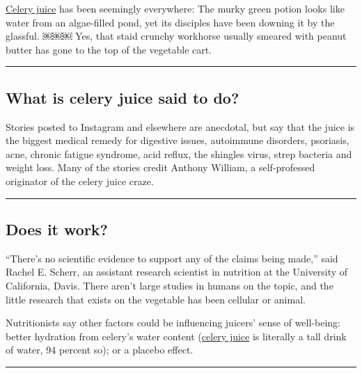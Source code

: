 \href{https://fdc.nal.usda.gov/fdc-app.html\#/food-details/342643/nutrients}{Celery
juice} has been seemingly everywhere: The murky green potion looks like
water from an algae-filled pond, yet its disciples have been downing it
by the glassful. ￼￼￼ Yes, that staid crunchy workhorse usually smeared
with peanut butter has gone to the top of the vegetable cart.

\begin{center}\rule{0.5\linewidth}{\linethickness}\end{center}

\hypertarget{what-is-celery-juice-said-to-do}{%
\subsection{What is celery juice said to
do?}\label{what-is-celery-juice-said-to-do}}

Stories posted to Instagram and elsewhere are anecdotal, but say that
the juice is the biggest medical remedy for digestive issues, autoimmune
disorders, psoriasis, acne, chronic fatigue syndrome, acid reflux, the
shingles virus, strep bacteria and weight loss. Many of the stories
credit Anthony William, a self-professed originator of the celery juice
craze.

\begin{center}\rule{0.5\linewidth}{\linethickness}\end{center}

\hypertarget{does-it-work}{%
\subsection{Does it work?}\label{does-it-work}}

``There's no scientific evidence to support any of the claims being
made,'' said Rachel E. Scherr, an assistant research scientist in
nutrition at the University of California, Davis. There aren't large
studies in humans on the topic, and the little research that exists on
the vegetable has been cellular or animal.

Nutritionists say other factors could be influencing juicers' sense of
well-being: better hydration from celery's water content
(\href{https://fdc.nal.usda.gov/fdc-app.html\#/food-details/342643/nutrients}{celery
juice} is literally a tall drink of water, 94 percent so); or a placebo
effect.

\begin{center}\rule{0.5\linewidth}{\linethickness}\end{center}


